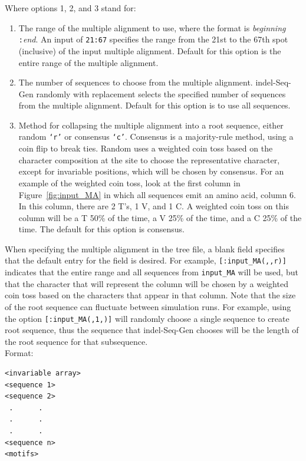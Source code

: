 \documentclass[10pt]{article}
\begin{document}
Where options 1, 2, and 3 stand for:
\begin{enumerate}
\item The range of the multiple alignment to use, where the format is {\it beginning}{\tt 
:}{\it end}.  An input of {\tt 21:67} specifies the range from the 21st to the 67th spot 
(inclusive) of the input multiple alignment.  Default for this option is the entire range of the multiple alignment. 
\item The number of sequences to choose from the multiple alignment.  indel-Seq-Gen randomly with replacement selects the specified number of sequences from the multiple alignment. Default for this option is to use all sequences.
\item Method for collapsing the multiple alignment into a root sequence, either random 
{\tt `r'} or consensus {\tt `c'}.  Consensus is a majority-rule method, using a coin flip to break ties.  Random uses a weighted coin toss based on the character composition at the site to choose the representative character, except for invariable positions, which will be chosen by consensus. For an example of the weighted coin toss, look at the first column in Figure~\ref{fig:input_MA} in which all sequences emit an amino acid, column 6.  In this 
column, there are 2 T's, 1 V, and 1 C.  A weighted coin toss on this column will be a T 50\% of the time, a V 25\% of the time, and a C 25\% of the time. The default for this option is consensus.
\end{enumerate}

When specifying the multiple alignment in the tree file, a blank field specifies that the default entry for the field is desired.  For example, \verb+[:input_MA(,,r)]+ indicates that the entire range and all sequences from {\tt input\_MA} will be used, but that the character that will represent the column will be chosen by a weighted coin toss based on the characters that appear in that column.  Note that the size of the root sequence can fluctuate between simulation runs.  For example, using the option \verb+[:input_MA(,1,)]+ will randomly choose a single sequence to create root sequence, thus the sequence that 
indel-Seq-Gen chooses will be the length of the root sequence for that subsequence.\\

Format:
\begin{verbatim}
<invariable array>
<sequence 1>
<sequence 2>
 .      .
 .      . 
 .      .
<sequence n>
<motifs>
\end{verbatim}
\end{document}
